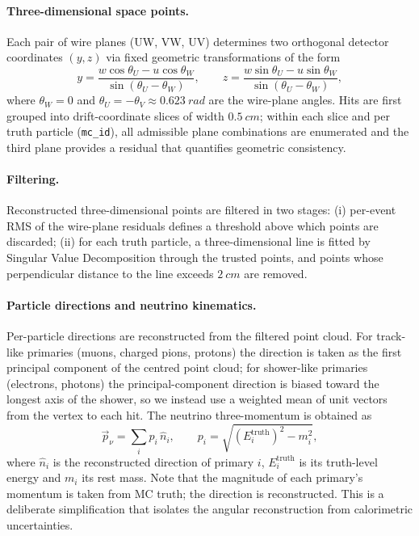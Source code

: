 \documentclass[11pt,a4paper]{article}
\begin{document}
\paragraph{Three-dimensional space points.}
Each pair of wire planes (UW, VW, UV) determines two orthogonal detector coordinates $(y,z)$ via fixed geometric transformations of the form
\begin{equation}
y = \frac{w\cos\theta_U - u\cos\theta_W}{\sin(\theta_U-\theta_W)},
\qquad
z = \frac{w\sin\theta_U - u\sin\theta_W}{\sin(\theta_U-\theta_W)},
\end{equation}
where $\theta_W=0$ and $\theta_U = -\theta_V \approx \SI{0.623}{rad}$ are the wire-plane angles.  Hits are first grouped into drift-coordinate slices of width $\SI{0.5}{cm}$; within each slice and per truth particle (\texttt{mc\_id}), all admissible plane combinations are enumerated and the third plane provides a residual that quantifies geometric consistency.

\paragraph{Filtering.}
Reconstructed three-dimensional points are filtered in two stages: (i) per-event RMS of the wire-plane residuals defines a threshold above which points are discarded; (ii) for each truth particle, a three-dimensional line is fitted by Singular Value Decomposition through the trusted points, and points whose perpendicular distance to the line exceeds $\SI{2}{cm}$ are removed.

\paragraph{Particle directions and neutrino kinematics.}
Per-particle directions are reconstructed from the filtered point cloud.  For track-like primaries (muons, charged pions, protons) the direction is taken as the first principal component of the centred point cloud; for shower-like primaries (electrons, photons) the principal-component direction is biased toward the longest axis of the shower, so we instead use a weighted mean of unit vectors from the vertex to each hit.  The neutrino three-momentum is obtained as
\begin{equation}
\vec p_\nu = \sum_i p_i\,\hat n_i, \qquad p_i = \sqrt{(E_i^{\text{truth}})^2 - m_i^2},
\end{equation}
where $\hat n_i$ is the reconstructed direction of primary $i$, $E_i^{\text{truth}}$ is its truth-level energy and $m_i$ its rest mass.  Note that the magnitude of each primary's momentum is taken from MC truth; the direction is reconstructed.  This is a deliberate simplification that isolates the angular reconstruction from calorimetric uncertainties.
\end{document}
